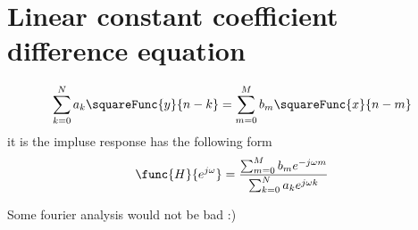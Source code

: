 \section{Linear constant coefficient difference equation}
\begin{equation*}
    \sum_{k = 0}^N a_k \squareFunc{y}{n - k} = \sum_{m = 0}^M b_m \squareFunc{x}{n -m}
\end{equation*}
it is the impluse response has the following form 
\begin{equation*}
    \func{H}{e^{j\omega}} = \dfrac{\sum_{m = 0}^M b_m e^{-j\omega m }}{ \sum_{k = 0}^N a_k e^{j\omega k}}
\end{equation*}

Some fourier analysis would not be bad :)